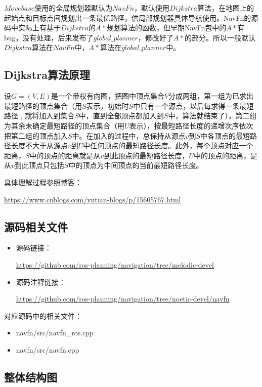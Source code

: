 \documentclass[9pt, oneside]{book}
\begin{document}
$Movebase$使用的全局规划器默认为$NavFn$，默认使用$Dijkstra$算法，在地图上的起始点和目标点间规划出一条最优路径，供局部规划器具体导航使用。NavFn的源码中实际上有基于$Dijkstra$的$A*$规划算法的函数，但早期NavFn包中的$A*$有bug，没有处理，后来发布了$global\_planner$，修改好了$A*$的部分。所以一般默认$Dijkstra$算法在$NavFn$中，$A*$算法在$global\_planner$中。

\subsection{Dijkstra算法原理}

设$G=(V,E)$是一个带权有向图，把图中顶点集合$V$分成两组，第一组为已求出最短路径的顶点集合（用$S$表示，初始时$S$中只有一个源点，以后每求得一条最短路径 , 就将加入到集合$S$中，直到全部顶点都加入到$S$中，算法就结束了），第二组为其余未确定最短路径的顶点集合（用$U$表示），按最短路径长度的递增次序依次把第二组的顶点加入$S$中。在加入的过程中，总保持从源点$v$到$S$中各顶点的最短路径长度不大于从源点$v$到$U$中任何顶点的最短路径长度。此外，每个顶点对应一个距离，$S$中的顶点的距离就是从$v$到此顶点的最短路径长度，$U$中的顶点的距离，是从$v$到此顶点只包括$S$中的顶点为中间顶点的当前最短路径长度。

具体理解过程参照博客：

\url{https://www.cnblogs.com/yutian-blogs/p/15605767.html}

\subsection{源码相关文件}

\begin{itemize}
    \item 源码链接：
    
    \url{https://github.com/ros-planning/navigation/tree/melodic-devel}

    \item 源码注释链接：
    
    \url{https://github.com/ros-planning/navigation/tree/noetic-devel/navfn}
\end{itemize}

对应源码中的相关文件：

\begin{itemize}
    \item navfn/src/navfn\_ros.cpp
    \item navfn/src/navfn.cpp
\end{itemize}

\subsection{整体结构图}
\end{document}

